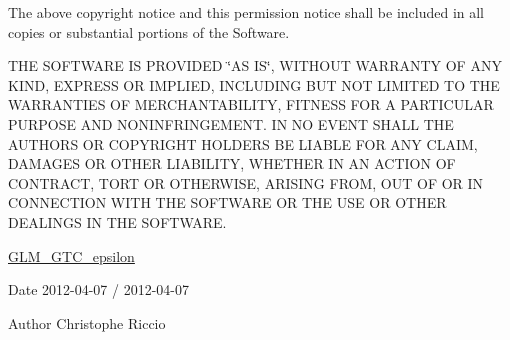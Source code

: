 The above copyright notice and this permission notice shall be included in all copies or substantial portions of the Software.

T\+HE S\+O\+F\+T\+W\+A\+RE IS P\+R\+O\+V\+I\+D\+ED \char`\"{}\+A\+S I\+S\char`\"{}, W\+I\+T\+H\+O\+UT W\+A\+R\+R\+A\+N\+TY OF A\+NY K\+I\+ND, E\+X\+P\+R\+E\+SS OR I\+M\+P\+L\+I\+ED, I\+N\+C\+L\+U\+D\+I\+NG B\+UT N\+OT L\+I\+M\+I\+T\+ED TO T\+HE W\+A\+R\+R\+A\+N\+T\+I\+ES OF M\+E\+R\+C\+H\+A\+N\+T\+A\+B\+I\+L\+I\+TY, F\+I\+T\+N\+E\+SS F\+OR A P\+A\+R\+T\+I\+C\+U\+L\+AR P\+U\+R\+P\+O\+SE A\+ND N\+O\+N\+I\+N\+F\+R\+I\+N\+G\+E\+M\+E\+NT. IN NO E\+V\+E\+NT S\+H\+A\+LL T\+HE A\+U\+T\+H\+O\+RS OR C\+O\+P\+Y\+R\+I\+G\+HT H\+O\+L\+D\+E\+RS BE L\+I\+A\+B\+LE F\+OR A\+NY C\+L\+A\+IM, D\+A\+M\+A\+G\+ES OR O\+T\+H\+ER L\+I\+A\+B\+I\+L\+I\+TY, W\+H\+E\+T\+H\+ER IN AN A\+C\+T\+I\+ON OF C\+O\+N\+T\+R\+A\+CT, T\+O\+RT OR O\+T\+H\+E\+R\+W\+I\+SE, A\+R\+I\+S\+I\+NG F\+R\+OM, O\+UT OF OR IN C\+O\+N\+N\+E\+C\+T\+I\+ON W\+I\+TH T\+HE S\+O\+F\+T\+W\+A\+RE OR T\+HE U\+SE OR O\+T\+H\+ER D\+E\+A\+L\+I\+N\+GS IN T\+HE S\+O\+F\+T\+W\+A\+RE.

\hyperlink{group__gtc__epsilon}{G\+L\+M\+\_\+\+G\+T\+C\+\_\+epsilon}

\begin{DoxyDate}{Date}
2012-\/04-\/07 / 2012-\/04-\/07 
\end{DoxyDate}
\begin{DoxyAuthor}{Author}
Christophe Riccio 
\end{DoxyAuthor}

